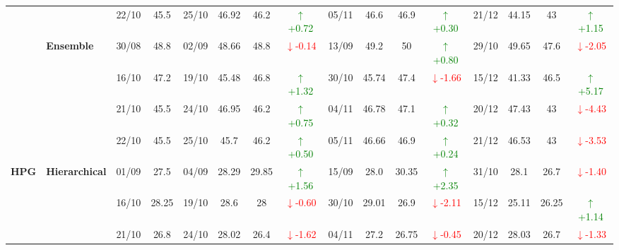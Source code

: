 {\begin{longtable}{llcc|cccc|cccc|cccc}
&
& 22/10 & 45.5 & 25/10 & 46.92 & 46.2 & \textcolor{green}{\(\uparrow\)+0.72} & 05/11 & 46.6 & 46.9 & \textcolor{green}{\(\uparrow\)+0.30} & 21/12 & 44.15 & 43 & \textcolor{green}{\(\uparrow\)+1.15} \\
\cmidrule(lr){2-16}



& \textbf{Ensemble}
& 30/08 & 48.8 & 02/09 & 48.66 & 48.8 & \textcolor{red}{\(\downarrow\)-0.14} & 13/09 & 49.2 & 50 & \textcolor{green}{\(\uparrow\)+0.80} & 29/10 & 49.65 & 47.6 & \textcolor{red}{\(\downarrow\)-2.05} \\

&
& 16/10 & 47.2 & 19/10 & 45.48 & 46.8 & \textcolor{green}{\(\uparrow\)+1.32} & 30/10 & 45.74 & 47.4 & \textcolor{red}{\(\downarrow\)-1.66} & 15/12 & 41.33 & 46.5 & \textcolor{green}{\(\uparrow\)+5.17} \\

&
& 21/10 & 45.5 & 24/10 & 46.95 & 46.2 & \textcolor{green}{\(\uparrow\)+0.75} & 04/11 & 46.78 & 47.1 & \textcolor{green}{\(\uparrow\)+0.32} & 20/12 & 47.43 & 43 & \textcolor{red}{\(\downarrow\)-4.43} \\

&
& 22/10 & 45.5 & 25/10 & 45.7 & 46.2 & \textcolor{green}{\(\uparrow\)+0.50} & 05/11 & 46.66 & 46.9 & \textcolor{green}{\(\uparrow\)+0.24} & 21/12 & 46.53 & 43 & \textcolor{red}{\(\downarrow\)-3.53} \\
\midrule


\multirow{12}{*}{\textbf{HPG}} 
& \textbf{Hierarchical}
& 01/09 & 27.5 & 04/09 & 28.29 & 29.85 & \textcolor{green}{\(\uparrow\)+1.56} & 15/09 & 28.0 & 30.35 & \textcolor{green}{\(\uparrow\)+2.35} & 31/10 & 28.1 & 26.7 & \textcolor{red}{\(\downarrow\)-1.40} \\

& 
& 16/10 & 28.25 & 19/10 & 28.6 & 28 & \textcolor{red}{\(\downarrow\)-0.60} & 30/10 & 29.01 & 26.9 & \textcolor{red}{\(\downarrow\)-2.11} & 15/12 & 25.11 & 26.25 & \textcolor{green}{\(\uparrow\)+1.14} \\

& 
& 21/10 & 26.8 & 24/10 & 28.02 & 26.4 & \textcolor{red}{\(\downarrow\)-1.62} & 04/11 & 27.2 & 26.75 & \textcolor{red}{\(\downarrow\)-0.45} & 20/12 & 28.03 & 26.7 & \textcolor{red}{\(\downarrow\)-1.33} \\


\end{longtable}}
